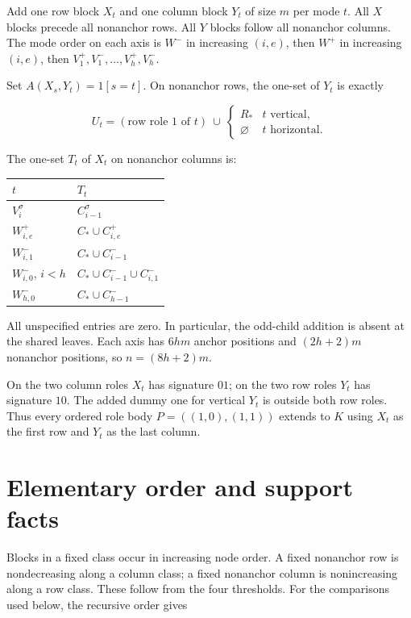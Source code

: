\documentclass[11pt,letterpaper]{article}
\begin{document}
Add one row block \(X_t\) and one column block \(Y_t\) of size \(m\) per
mode \(t\). All \(X\) blocks precede all nonanchor rows. All \(Y\)
blocks follow all nonanchor columns. The mode order on each axis is
\(W^-\) in increasing \((i,e)\), then \(W^+\) in increasing \((i,e)\),
then \(V_1^+,V_1^-,\ldots ,V_h^+,V_h^-\).

Set \(A(X_s,Y_t)=1[s=t]\). On nonanchor rows, the one-set of \(Y_t\) is
exactly

\[
 U_t=(\text{row role 1 of }t)\ \cup\
 \begin{cases}R_* & t\text{ vertical},\\\varnothing&t\text{ horizontal}.\end{cases}
\]


The one-set \(T_t\) of \(X_t\) on nonanchor columns is:

\begin{longtable}[]{@{}ll@{}}
\toprule\noalign{}
\(t\) & \(T_t\) \\
\midrule\noalign{}
\endhead
\bottomrule\noalign{}
\endlastfoot
\(V_i^\sigma \) & \(C_{i-1}^\sigma \) \\
\(W_{i,e}^+\) & \(C_* \cup  C_{i,e}^+\) \\
\(W_{i,1}^-\) & \(C_* \cup  C_{i-1}^-\) \\
\(W_{i,0}^-\), \(i<h\) & \(C_* \cup  C_{i-1}^- \cup  C_{i,1}^-\) \\
\(W_{h,0}^-\) & \(C_* \cup  C_{h-1}^-\) \\
\end{longtable}

All unspecified entries are zero. In particular, the odd-child addition
is absent at the shared leaves. Each axis has \(6hm\) anchor positions
and \((2h+2)m\) nonanchor positions, so \(n=(8h+2)m\).

On the two column roles \(X_t\) has signature \(01\); on the two row
roles \(Y_t\) has signature \(10\). The added dummy one for vertical
\(Y_t\) is outside both row roles. Thus every ordered role body
\(P=((1,0),(1,1))\) extends to \(K\) using \(X_t\) as the first row and
\(Y_t\) as the last column.

\section{Elementary order and support
facts}\label{elementary-order-and-support-facts}

Blocks in a fixed class occur in increasing node order. A fixed
nonanchor row is nondecreasing along a column class; a fixed nonanchor
column is nonincreasing along a row class. These follow from the four
thresholds. For the comparisons used below, the recursive order gives
\end{document}
